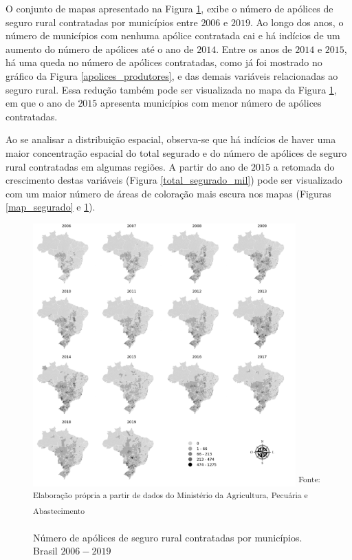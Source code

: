 O conjunto de mapas apresentado na Figura \ref{map_apolices}, exibe o número de apólices de seguro rural contratadas por municípios entre $2006$ e $2019$. Ao longo dos anos, o número de municípios com nenhuma apólice contratada cai e há indícios de um aumento do número de apólices até o ano de $2014$. Entre os anos de $2014$ e $2015$, há uma queda no número de apólices contratadas, como já foi mostrado no gráfico da Figura \ref{apolices_produtores}, e das demais variáveis relacionadas ao seguro rural. Essa redução também pode ser visualizada no mapa da Figura \ref{map_apolices}, em que o ano de $2015$ apresenta municípios com menor número de apólices contratadas. 

Ao se analisar a distribuição espacial, observa-se que há indícios de haver uma maior concentração espacial do total segurado e do número de apólices de seguro rural contratadas em algumas regiões. A partir do ano de $2015$ a retomada do crescimento destas variáveis (Figura \ref{total_segurado_mil}) pode ser visualizado com um maior número de áreas de coloração mais escura nos mapas (Figuras \ref{map_segurado} e \ref{map_apolices}).

\begin{figure}[H]
	\centering
	\caption{Número de apólices de seguro rural contratadas por municípios. Brasil $2006 - 2019$}
	\includegraphics[width=0.9\textwidth]{figuras/map_apolices_contratadas.png}
	\small \textsuperscript {Fonte: Elaboração própria a partir de dados do Ministério da Agricultura, Pecuária e Abastecimento \cite{brasil21b}}
    \label{map_apolices}
\end{figure}

